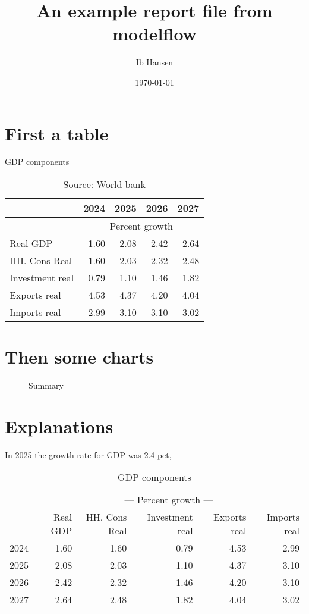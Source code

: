\documentclass{article}
\begin{document}
\title{An example report file from modelflow }
\author{Ib Hansen}
\date{\today} 

\maketitle
\tableofcontents
\newpage
\section{First a table}

\begin{table}[ht]
\caption{GDP components}
\begin{tabular}{lrrrr}
\toprule
 & 2024 & 2025 & 2026 & 2027 \\
\midrule
&\multicolumn{4}{c}{{---  Percent growth ---}}                     \\
Real GDP & 1.60 & 2.08 & 2.42 & 2.64 \\
HH. Cons Real & 1.60 & 2.03 & 2.32 & 2.48 \\
Investment real & 0.79 & 1.10 & 1.46 & 1.82 \\
Exports real & 4.53 & 4.37 & 4.20 & 4.04 \\
Imports real & 2.99 & 3.10 & 3.10 & 3.02 \\
\bottomrule
\end{tabular}
\caption*{Source: World bank }
\end{table}
\section{Then some charts } 
\begin{figure}[htbp]
\centering
\resizebox{\textwidth}{!}{}
\caption{Summary}
\end{figure}
\section{Explanations}
In 2025 the growth rate for GDP was 2.4 pct,




\begin{table}[ht]
\caption{GDP components}
\begin{tabular}{lrrrrr}
\toprule
 & \multicolumn{5}{c}{---  Percent growth ---} \\
 & Real GDP & HH. Cons Real & Investment real & Exports real & Imports real \\
\midrule
2024 & 1.60 & 1.60 & 0.79 & 4.53 & 2.99 \\
2025 & 2.08 & 2.03 & 1.10 & 4.37 & 3.10 \\
2026 & 2.42 & 2.32 & 1.46 & 4.20 & 3.10 \\
2027 & 2.64 & 2.48 & 1.82 & 4.04 & 3.02 \\
\bottomrule
\end{tabular}
\end{table}
\end{document}
